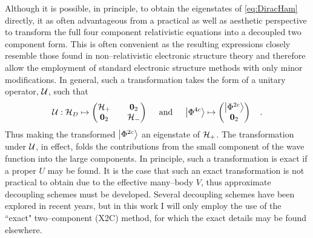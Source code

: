 Although it is possible, in principle, to obtain the eigenstates of
\cref{eq:DiracHam} directly, it as often advantageous from a practical as well
as aesthetic perspective to transform the full four component relativistic
equations into a decoupled two component form. This is often convenient as the
resulting expressions closely resemble those found in non--relativistic
electronic structure theory and therefore allow the employment of standard
electronic structure methods with only minor modifications. In general, such a
transformation takes the form of a unitary operator, $\mathcal{U}$, such that
\begin{equation}
\mathcal{U}: 
\mathcal{H}_D \mapsto \begin{pmatrix}
\mathcal{H}_+ && \boldsymbol{0}_2 \\ \boldsymbol{0}_2 && \mathcal{H}_- 
\end{pmatrix} \quad \text{ and } \quad
\left\vert \Phi^{4c} \right\rangle \mapsto \begin{pmatrix}
 \left\vert \Phi^{2c} \right\rangle \\ \boldsymbol{0}_2
\end{pmatrix} \quad.
\end{equation}
Thus making the transformed $\left\vert \Phi^{2c} \right\rangle$ an eigenstate of $\mathcal{H}_+$.
The transformation under $\mathcal{U}$, in effect, folds the contributions from
the small component of the wave function into the large components. In principle,
such a transformation is exact if a proper $U$ may be found. It is the case
that such an exact transformation is not practical to obtain due to the
effective many--body $V$, thus approximate decoupling schemes must be developed.
Several decoupling schemes have been explored in recent years, but in this work
I will only employ the use of the ``exact" two--component (X2C) method, for which
the exact details may be found elsewhere.

